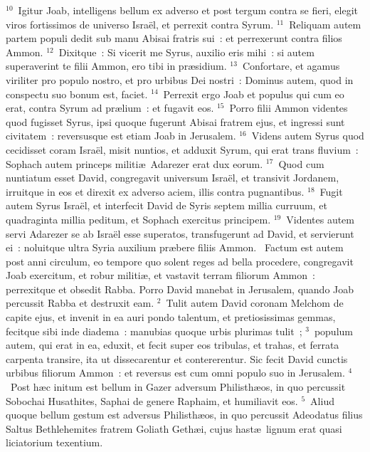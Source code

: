 ${}^{10}$~Igitur Joab, intelligens bellum ex adverso et post tergum contra se fieri, elegit viros fortissimos de universo Isra\"el, et perrexit contra Syrum.
${}^{11}$~Reliquam autem partem populi dedit sub manu Abisai fratris sui~: et perrexerunt contra filios Ammon.
${}^{12}$~Dixitque~: Si vicerit me Syrus, auxilio eris mihi~: si autem superaverint te filii Ammon, ero tibi in pr\ae sidium.
${}^{13}$~Confortare, et agamus viriliter pro populo nostro, et pro urbibus Dei nostri~: Dominus autem, quod in conspectu suo bonum est, faciet.
${}^{14}$~Perrexit ergo Joab et populus qui cum eo erat, contra Syrum ad pr\ae lium~: et fugavit eos.
${}^{15}$~Porro filii Ammon videntes quod fugisset Syrus, ipsi quoque fugerunt Abisai fratrem ejus, et ingressi sunt civitatem~: reversusque est etiam Joab in Jerusalem.
${}^{16}$~Videns autem Syrus quod cecidisset coram Isra\"el, misit nuntios, et adduxit Syrum, qui erat trans fluvium~: Sophach autem princeps militi\ae\ Adarezer erat dux eorum.
${}^{17}$~Quod cum nuntiatum esset David, congregavit universum Isra\"el, et transivit Jordanem, irruitque in eos et direxit ex adverso aciem, illis contra pugnantibus.
${}^{18}$~Fugit autem Syrus Isra\"el, et interfecit David de Syris septem millia curruum, et quadraginta millia peditum, et Sophach exercitus principem.
${}^{19}$~Videntes autem servi Adarezer se ab Isra\"el esse superatos, transfugerunt ad David, et servierunt ei~: noluitque ultra Syria auxilium pr\ae bere filiis Ammon.
~Factum est autem post anni circulum, eo tempore quo solent reges ad bella procedere, congregavit Joab exercitum, et robur militi\ae , et vastavit terram filiorum Ammon~: perrexitque et obsedit Rabba. Porro David manebat in Jerusalem, quando Joab percussit Rabba et destruxit eam.
${}^{2}$~Tulit autem David coronam Melchom de capite ejus, et invenit in ea auri pondo talentum, et pretiosissimas gemmas, fecitque sibi inde diadema~: manubias quoque urbis plurimas tulit~;
${}^{3}$~populum autem, qui erat in ea, eduxit, et fecit super eos tribulas, et trahas, et ferrata carpenta transire, ita ut dissecarentur et contererentur. Sic fecit David cunctis urbibus filiorum Ammon~: et reversus est cum omni populo suo in Jerusalem.
${}^{4}$~Post h\ae c initum est bellum in Gazer adversum Philisth\ae os, in quo percussit Sobochai Husathites, Saphai de genere Raphaim, et humiliavit eos.
${}^{5}$~Aliud quoque bellum gestum est adversus Philisth\ae os, in quo percussit Adeodatus filius Saltus Bethlehemites fratrem Goliath Geth\ae i, cujus hast\ae\ lignum erat quasi liciatorium texentium.

